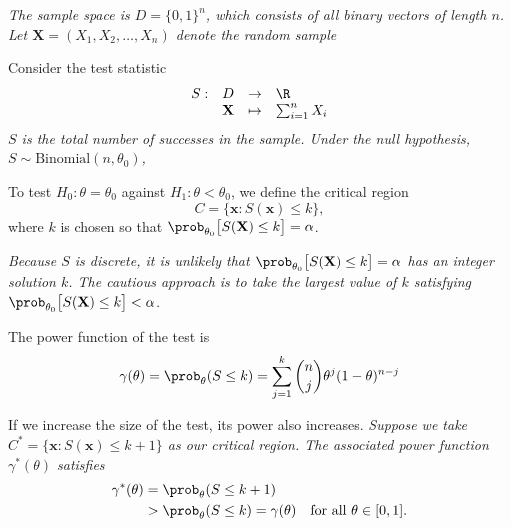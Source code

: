 \begin{solution}

\bit
\it The sample space is $D = \{0,1\}^n$, which consists of all binary vectors of length $n$.
\it Let $\mathbf{X}=(X_1,X_2,\ldots,X_n)$ denote the random sample
\eit

Consider the test statistic 
\[
\begin{array}{rccl}
S: & D & \to & \R \\
 & \mathbf{X} & \mapsto & \sum_{i=1}^n X_i
\end{array}
\]
\bit
\it $S$ is the total number of successes in the sample.
\it Under the null hypothesis, $S\sim\text{Binomial}(n,\theta_0)$,
\eit

%

To test $H_0:\theta=\theta_0$ against $H_1:\theta<\theta_0$, we define the critical region
\[
C = \{\mathbf{x} : S(\mathbf{x}) \leq k\},
\]
where $k$ is chosen so that $\prob_{\theta_0}\big[S(\mathbf{X})\leq k\big] = \alpha$.

\bit
\it Because $S$ is \emph{discrete}, it is unlikely that $\prob_{\theta_0}\big[S(\mathbf{X})\leq k\big] = \alpha$ has an integer solution $k$.
\it The cautious approach is to take the largest value of $k$ satisfying $\prob_{\theta_0}\big[S(\mathbf{X})\leq k\big] < \alpha$.
\eit

The power function of the test is
\[
\gamma(\theta) 
	= \prob_{\theta}(S\leq k) 
	= \sum_{j=1}^k\binom{n}{j}\theta^j(1-\theta)^{n-j}
\]	
\end{solution}



\begin{remark}
If we increase the size of the test, its power also increases. 
\bit
\it Suppose we take $C^{*} = \{\mathbf{x} : S(\mathbf{x}) \leq k+1 \}$ as our critical region.
\it The associated power function $\gamma^{*}(\theta)$ satisfies  
\begin{align*}
\gamma^{*}(\theta) 
	& = \prob_{\theta}(S\leq k+1) \\
	& > \prob_{\theta}(S\leq k) = \gamma(\theta) \text{\quad for all $\theta\in[0,1]$.}
\end{align*}
\eit
\end{remark}

